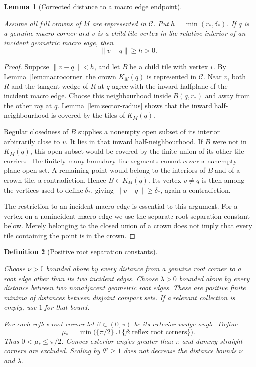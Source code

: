 \documentclass[11pt,a4paper]{article}
\newtheorem{definition}{Definition}[section]
\newtheorem{lemma}[definition]{Lemma}
\theoremstyle{remark}
\newcommand{\lean}[1]{}
\newcommand{\uses}[1]{}
\begin{document}
\begin{lemma}[Corrected distance to a macro edge endpoint]
\label{lem:endpoint-gap}
\lean{Tilings.Crowns.incidentMacroEdgeVertexGap}
\uses{def:crown-sector,def:macro-boundary,lem:sector-radius,lem:macrocorner}
Assume all full crowns of $M$ are represented in $\mathcal C$.  Put
$h=\min(r_*,\delta_*)$.  If $q$ is a genuine macro corner and $v$ is a
child-tile vertex in the relative interior of an incident geometric macro
edge, then
\[
  \lVert v-q\rVert\ge h>0.
\]
\end{lemma}
\begin{proof}
Suppose $\lVert v-q\rVert<h$, and let $B$ be a child tile with vertex $v$.
By Lemma~\ref{lem:macrocorner} the crown $K_M(q)$ is represented in
$\mathcal C$.  Near $v$, both $R$ and the tangent wedge of $R$ at $q$
agree with the inward halfplane of the incident macro edge.  Choose this
neighbourhood inside $B(q,r_*)$ and away from the other ray at $q$.
Lemma~\ref{lem:sector-radius} shows that the inward half-neighbourhood is
covered by the tiles of $K_M(q)$.

Regular closedness of $B$ supplies a nonempty open subset of its interior
arbitrarily close to $v$.  It lies in that inward half-neighbourhood.  If
$B$ were not in $K_M(q)$, this open subset would be covered by the finite
union of its other tile carriers.  The finitely many boundary line
segments cannot cover a nonempty plane open set.  A remaining point would
belong to the interiors of $B$ and of a crown tile, a contradiction.
Hence $B\in K_M(q)$.  Its vertex $v\ne q$ is then among the vertices used
to define $\delta_*$, giving $\lVert v-q\rVert\ge\delta_*$, again a
contradiction.

The restriction to an incident macro edge is essential to this argument.
For a vertex on a nonincident macro edge we use the separate root
separation constant below.  Merely belonging to the closed union of a
crown does not imply that every tile containing the point is in the crown.
\end{proof}

\begin{definition}[Positive root separation constants]
\label{def:crown-separation}
\lean{Tilings.Crowns.rootSeparationConstants}
\uses{def:protoset,def:macro-boundary}
Choose $\nu>0$ bounded above by every distance from a genuine root corner
to a root edge other than its two incident edges.  Choose $\lambda>0$
bounded above by every distance between two nonadjacent geometric root
edges.  These are positive finite minima of distances between disjoint
compact sets.  If a relevant collection is empty, use $1$ for that bound.

For each reflex root corner let $\beta\in(0,\pi)$ be its exterior wedge
angle.  Define
\[
  \mu_* =\min\bigl(\{\pi/2\}\cup
          \{\beta:\text{reflex root corners}\}\bigr).
\]
Thus $0<\mu_*\le\pi/2$.  Convex exterior angles greater than $\pi$ and
dummy straight corners are excluded.  Scaling by $\theta^j\ge1$ does
not decrease the distance bounds $\nu$ and $\lambda$.
\end{definition}
\end{document}
